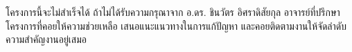   \iffalse
    \begin{dedication}
      This document is dedicated to all Chiang Mai University students.
      
      Dedication page is optional.
    \end{dedication}
  \fi %
  
  \begin{acknowledgments}
    โครงการนี้จะไม่สำเร็จได้ ถ้าไม่ได้รับความกรุณาจาก อ.ดร. ชินวัตร อิศราดิสัยกุล 
    อาจารย์ที่ปรึกษาโครงการที่คอยให้ความช่วยเหลือ เสนอแนะแนวทางในการแก้ปัญหา 
    และคอยติดตามงานให้จัดลำดับความสำคัญงานอยู่เสมอ
    
  \end{acknowledgments}%
\fi %

\contentspage

\ifproject
  \figurelistpage
  
  \tablelistpage
\fi %



